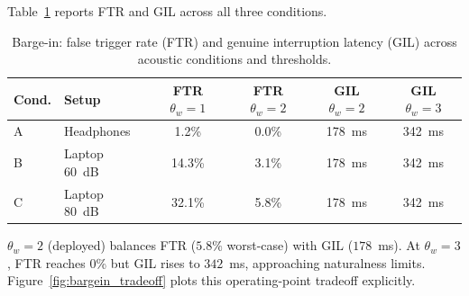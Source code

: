 \documentclass[11pt,a4paper]{article}
\begin{document}
Table~\ref{tab:bargein_ftr} reports FTR and GIL across all three conditions.

\begin{table}[htbp]
\centering\small
\caption{Barge-in: false trigger rate (FTR) and genuine interruption latency (GIL) across acoustic conditions and thresholds.}
\label{tab:bargein_ftr}
\renewcommand{\arraystretch}{1.2}
\begin{tabularx}{\textwidth}{llcccc}
\toprule
\textbf{Cond.} & \textbf{Setup} & \textbf{FTR $\theta_w{=}1$} & \textbf{FTR $\theta_w{=}2$} & \textbf{GIL $\theta_w{=}2$} & \textbf{GIL $\theta_w{=}3$} \\
\midrule
A & Headphones & 1.2\% & 0.0\% & 178~ms & 342~ms \\
B & Laptop 60~dB & 14.3\% & 3.1\% & 178~ms & 342~ms \\
C & Laptop 80~dB & 32.1\% & 5.8\% & 178~ms & 342~ms \\
\bottomrule
\end{tabularx}
\end{table}

$\theta_w{=}2$ (deployed) balances FTR ($5.8\%$ worst-case) with GIL ($178$~ms). At $\theta_w{=}3$, FTR reaches 0\% but GIL rises to $342$~ms, approaching naturalness limits. Figure~\ref{fig:bargein_tradeoff} plots this operating-point tradeoff explicitly.
\end{document}

